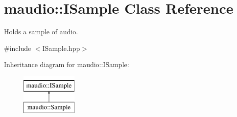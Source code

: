 \hypertarget{classmaudio_1_1ISample}{\section{maudio\-:\-:I\-Sample Class Reference}
\label{classmaudio_1_1ISample}
}


Holds a sample of audio.  




{\ttfamily \#include $<$I\-Sample.\-hpp$>$}

Inheritance diagram for maudio\-:\-:I\-Sample\-:\begin{figure}[H]
\begin{center}
\leavevmode
\includegraphics[height=2.000000cm]{classmaudio_1_1ISample}
\end{center}
\end{figure}
